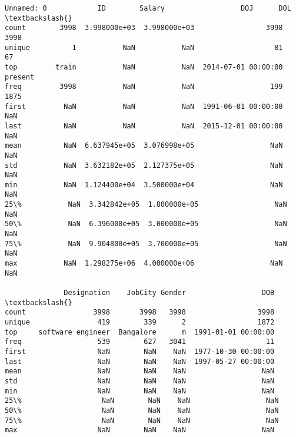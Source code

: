 \documentclass[11pt]{article}
\makeatletter
\newcommand{\boxspacing}{\kern\kvtcb@left@rule\kern\kvtcb@boxsep}
\newcommand{\prompt}[4]{
        \ttfamily\llap{{\color{#2}[#3]:\hspace{3pt}#4}}\vspace{-\baselineskip}
    }
\makeatother
\begin{document}
            \begin{tcolorbox}[breakable, size=fbox, boxrule=.5pt, pad at break*=1mm, opacityfill=0]
\prompt{Out}{outcolor}{4}{\boxspacing}
\begin{Verbatim}[commandchars=\\\{\}]
       Unnamed: 0            ID        Salary                  DOJ      DOL  \textbackslash{}
count        3998  3.998000e+03  3.998000e+03                 3998     3998
unique          1           NaN           NaN                   81       67
top         train           NaN           NaN  2014-07-01 00:00:00  present
freq         3998           NaN           NaN                  199     1875
first         NaN           NaN           NaN  1991-06-01 00:00:00      NaN
last          NaN           NaN           NaN  2015-12-01 00:00:00      NaN
mean          NaN  6.637945e+05  3.076998e+05                  NaN      NaN
std           NaN  3.632182e+05  2.127375e+05                  NaN      NaN
min           NaN  1.124400e+04  3.500000e+04                  NaN      NaN
25\%           NaN  3.342842e+05  1.800000e+05                  NaN      NaN
50\%           NaN  6.396000e+05  3.000000e+05                  NaN      NaN
75\%           NaN  9.904800e+05  3.700000e+05                  NaN      NaN
max           NaN  1.298275e+06  4.000000e+06                  NaN      NaN

              Designation    JobCity Gender                  DOB  \textbackslash{}
count                3998       3998   3998                 3998
unique                419        339      2                 1872
top     software engineer  Bangalore      m  1991-01-01 00:00:00
freq                  539        627   3041                   11
first                 NaN        NaN    NaN  1977-10-30 00:00:00
last                  NaN        NaN    NaN  1997-05-27 00:00:00
mean                  NaN        NaN    NaN                  NaN
std                   NaN        NaN    NaN                  NaN
min                   NaN        NaN    NaN                  NaN
25\%                   NaN        NaN    NaN                  NaN
50\%                   NaN        NaN    NaN                  NaN
75\%                   NaN        NaN    NaN                  NaN
max                   NaN        NaN    NaN                  NaN


\end{Verbatim}
\end{tcolorbox}
\end{document}
